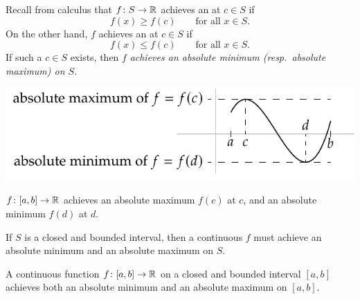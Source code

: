 Recall from calculus that $f \colon S \to {\mathbb{R}}$ achieves an
\emph{} at $c \in S$ if
\begin{equation*}
f(x) \geq f(c) \qquad \text{for all } x \in S.
\end{equation*}
On the other hand, $f$ achieves an 
\emph{} at $c \in S$ if
\begin{equation*}
f(x) \leq f(c) \qquad \text{for all } x \in S.
\end{equation*}
If such a $c \in S$ exists, then 
$f$ \emph{achieves an absolute minimum (resp.\ absolute maximum) on
$S$}.
\begin{myfigureht}
\includegraphics{figures/minmax}
\caption{$f \colon [a,b] \to {\mathbb{R}}$ achieves an absolute maximum $f(c)$ at
$c$, and an absolute minimum $f(d)$ at $d$.\label{fig:minmax}}
\end{myfigureht}

If $S$ is a closed
and bounded interval, then a continuous $f$
must achieve an absolute minimum and an absolute
maximum on $S$.

\begin{thm}
%
%
%
A continuous function $f \colon [a,b] \to {\mathbb{R}}$ on a closed and bounded
interval $[a,b]$ 
achieves both an absolute minimum and an absolute maximum on $[a,b]$.
\end{thm}

